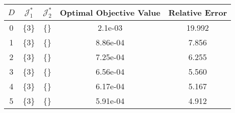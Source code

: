 \begin{subtable}{\textwidth}
\centering
\begin{tabular}{|c|c|c|c|c|}
  \hline
$D$ & $\mathcal J_1^*$ & $\mathcal J_2^*$ & Optimal Objective Value & Relative Error \\ 
  \hline
0 & \{3\} & \{\} & 2.1e-03 & 19.992 \\ 
  1 & \{3\} & \{\} & 8.86e-04 & 7.856 \\ 
  2 & \{3\} & \{\} & 7.25e-04 & 6.255 \\ 
  3 & \{3\} & \{\} & 6.56e-04 & 5.560 \\ 
  4 & \{3\} & \{\} & 6.17e-04 & 5.167 \\ 
  5 & \{3\} & \{\} & 5.91e-04 & 4.912 \\ 
   \hline
\end{tabular}
\end{subtable}
